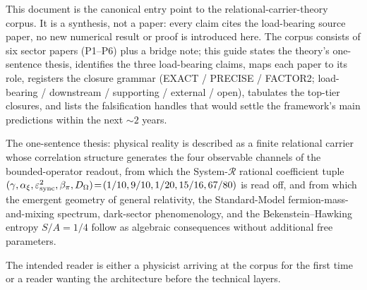 
This document is the canonical entry point to the
relational-carrier-theory corpus. It is a synthesis, not a
paper: every claim cites the load-bearing source paper, no new
numerical result or proof is introduced here. The corpus
consists of six sector papers (P1--P6) plus a bridge note;
this guide states the theory's one-sentence thesis,
identifies the three load-bearing claims, maps each paper to
its role, registers the closure grammar (EXACT / PRECISE /
FACTOR2; load-bearing / downstream / supporting / external /
open), tabulates the top-tier closures, and lists the
falsification handles that would settle the framework's main
predictions within the next $\sim\!2$ years.

The one-sentence thesis: physical reality is described as a
finite relational carrier whose correlation structure
generates the four observable channels of the
bounded-operator readout, from which the System-$\mathcal R$
rational coefficient tuple
$(\gamma,\alpha_{\xi},\varepsilon_{\rm sync}^{2},
\beta_{\pi},D_{\Omega})\!=\!(1/10,9/10,1/20,15/16,67/80)$ is
read off, and from which the emergent geometry of general
relativity, the Standard-Model fermion-mass-and-mixing
spectrum, dark-sector phenomenology, and the
Bekenstein--Hawking entropy $S/A\!=\!1/4$ follow as
algebraic consequences without additional free parameters.

The intended reader is either a physicist arriving at the
corpus for the first time or a reader wanting the
architecture before the technical layers.
